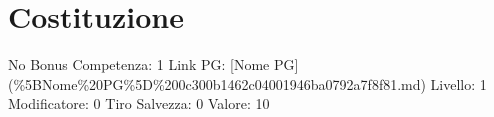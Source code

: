 \section{Costituzione}\label{costituzione}

\begin{description}
\tightlist
\item[Tags: STAT]
No Bonus Competenza: 1 Link PG: {[}Nome PG{]}
(\%5BNome\%20PG\%5D\%200c300b1462c04001946ba0792a7f8f81.md) Livello: 1
Modificatore: 0 Tiro Salvezza: 0 Valore: 10
\end{description}
